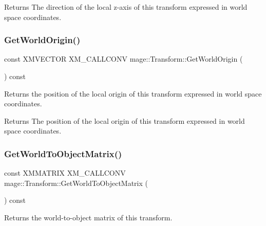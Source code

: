 \begin{DoxyReturn}{Returns}
The direction of the local z-\/axis of this transform expressed in world space coordinates. 
\end{DoxyReturn}
\mbox{\label{classmage_1_1_transform_a1458cffad0cf017a2302200b2679a906}} 
\subsubsection{\texorpdfstring{Get\+World\+Origin()}{GetWorldOrigin()}}
{\footnotesize\ttfamily const X\+M\+V\+E\+C\+T\+OR X\+M\+\_\+\+C\+A\+L\+L\+C\+O\+NV mage\+::\+Transform\+::\+Get\+World\+Origin (\begin{DoxyParamCaption}{ }\end{DoxyParamCaption}) const\hspace{0.3cm}{\ttfamily [noexcept]}}

Returns the position of the local origin of this transform expressed in world space coordinates.

\begin{DoxyReturn}{Returns}
The position of the local origin of this transform expressed in world space coordinates. 
\end{DoxyReturn}
\mbox{\label{classmage_1_1_transform_af415c8f2b8d22e69df2878044b9414c5}} 
\subsubsection{\texorpdfstring{Get\+World\+To\+Object\+Matrix()}{GetWorldToObjectMatrix()}}
{\footnotesize\ttfamily const X\+M\+M\+A\+T\+R\+IX X\+M\+\_\+\+C\+A\+L\+L\+C\+O\+NV mage\+::\+Transform\+::\+Get\+World\+To\+Object\+Matrix (\begin{DoxyParamCaption}{ }\end{DoxyParamCaption}) const\hspace{0.3cm}{\ttfamily [noexcept]}}

Returns the world-\/to-\/object matrix of this transform.

